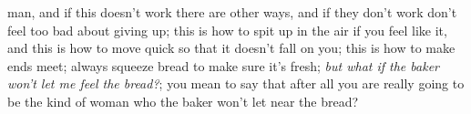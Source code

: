 \documentclass[10pt,a4paper]{article}
\begin{document}
man, and if this doesn’t work there are other ways, and if they don’t work don’t feel too bad about giving up; this is how to spit up in the air if you feel like it, and this is how to move quick so that it doesn’t fall on you; this is how to make ends meet; always squeeze bread to make sure it’s fresh; \emph{but what if the baker won’t let me feel the bread?}; you mean to say that after all you are really going to be the kind of woman who the baker won’t let near the bread?
\end{document}
